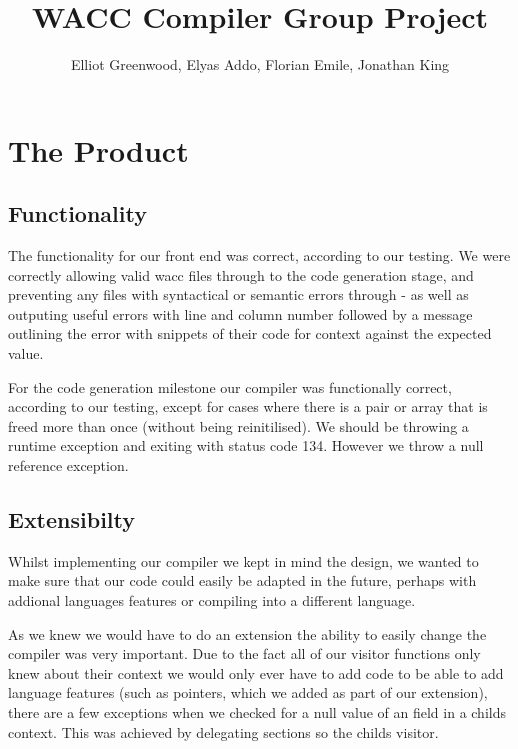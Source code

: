 \documentclass[11pt,a4paper]{article}
\begin{document}
\title{WACC Compiler Group Project}
\author{Elliot Greenwood, Elyas Addo, Florian Emile, Jonathan King}

\maketitle

\section{The Product}
\label{sec:The Product}

\subsection{Functionality}
\label{sub:Functionality}

The functionality for our front end was correct, according to our testing. We were correctly allowing valid wacc files through to the code generation stage, and preventing any files with syntactical or semantic errors through - as well as outputing useful errors with line and column number followed by a message outlining the error with snippets of their code for context against the expected value.

For the code generation milestone our compiler was functionally correct, according to our testing, except for cases where there is a pair or array that is freed more than once (without being reinitilised). We should be throwing a runtime exception and exiting with status code 134. However we throw a null reference exception.

\subsection{Extensibilty}
\label{subs:Extensibilty}

Whilst implementing our compiler we kept in mind the design, we wanted to make sure that our code could easily be adapted in the future, perhaps with addional languages features or compiling into a different language.

As we knew we would have to do an extension the ability to easily change the compiler was very important. Due to the fact all of our visitor functions only knew about their context we would only ever have to add code to be able to add language features (such as pointers, which we added as part of our extension), there are a few exceptions when we checked for a null value of an field in a childs context. This was achieved by delegating sections so the childs visitor.
\end{document}
